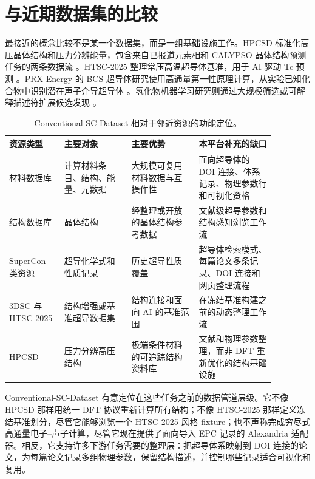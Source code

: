 \documentclass[11pt,a4paper]{ctexart}
\begin{document}
\section{与近期数据集的比较}

最接近的概念比较不是某一个数据集，而是一组基础设施工作。HPCSD 标准化高压晶体结构和压力分辨能量，包含来自已报道元素相和 CALYPSO 晶体结构预测任务的两条数据流 \cite{wang2026hpcsd}。HTSC-2025 整理常压高温超导体基准，用于 AI 驱动 Tc 预测 \cite{han2025htsc}。PRX Energy 的 BCS 超导体研究使用高通量第一性原理计算，从实验已知化合物中识别潜在声子介导超导体 \cite{bercx2025prxenergy}。氢化物机器学习研究则通过大规模筛选或可解释描述符扩展候选发现 \cite{pires2026ambient,chen2026descriptors}。

\begin{table}[t]
\centering
\caption{Conventional-SC-Dataset 相对于邻近资源的功能定位。}
\label{tab:comparison-zh}
\begin{tabular}{>{\raggedright\arraybackslash}p{0.18\linewidth} >{\raggedright\arraybackslash}p{0.22\linewidth} >{\raggedright\arraybackslash}p{0.22\linewidth} >{\raggedright\arraybackslash}p{0.25\linewidth}}
\toprule
资源类型 & 主要对象 & 主要优势 & 本平台补充的缺口 \\
\midrule
材料数据库 & 计算材料条目、结构、能量、元数据 & 大规模可复用材料数据与互操作性 & 面向超导体的 DOI 连接、体系记录、物理参数行和可视化资格 \\
结构数据库 & 晶体结构 & 经整理或开放的晶体结构参考数据 & 文献级超导参数和结构感知浏览工作流 \\
SuperCon 类资源 & 超导化学式和性质记录 & 历史超导性质覆盖 & 超导体检索模式、每篇论文多条记录、DOI 连接和网页整理流程 \\
3DSC 与 HTSC-2025 & 结构增强或基准超导数据集 & 结构连接和面向 AI 的基准范围 & 在冻结基准构建之前的动态整理工作流 \\
HPCSD & 压力分辨高压结构 & 极端条件材料的可追踪结构资料库 & 文献和物理参数整理，而非 DFT 重新优化的结构基础设施 \\
\bottomrule
\end{tabular}
\end{table}

Conventional-SC-Dataset 有意定位在这些任务之前的数据管道层级。它不像 HPCSD 那样用统一 DFT 协议重新计算所有结构；不像 HTSC-2025 那样定义冻结基准划分，尽管它能够浏览一个 HTSC-2025 风格 fixture；也不声称完成穷尽式高通量电子--声子计算，尽管它现在提供了面向导入 EPC 记录的 Alexandria 适配器。相反，它支持许多下游任务需要的整理层：把超导体系映射到 DOI 连接的论文，为每篇论文记录多组物理参数，保留结构描述，并控制哪些记录适合可视化和复用。
\end{document}
